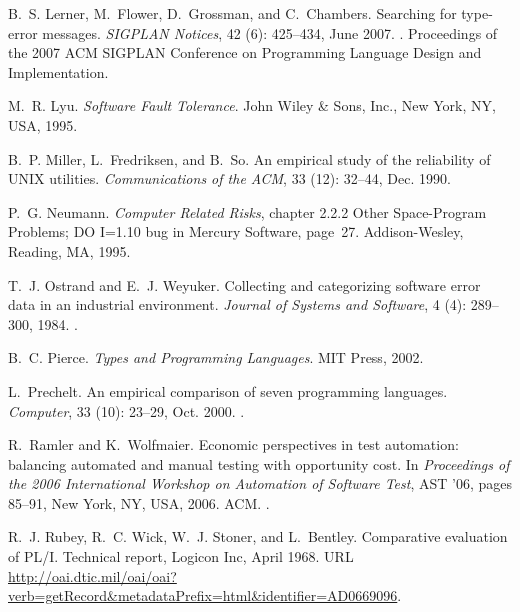 \documentclass[10pt]{sigplanconf}
\begin{document}
\begin{thebibliography}{35}
B.~S. Lerner, M.~Flower, D.~Grossman, and C.~Chambers.
\newblock Searching for type-error messages.
\newblock \emph{SIGPLAN Notices}, 42 (6): 425--434, June
  2007.
\newblock {}.
\newblock Proceedings of the 2007 ACM SIGPLAN Conference on Programming
  Language Design and Implementation.

M.~R. Lyu.
\newblock \emph{Software Fault Tolerance}.
\newblock John Wiley \& Sons, Inc., New York, NY, USA, 1995.

B.~P. Miller, L.~Fredriksen, and B.~So.
\newblock An empirical study of the reliability of {UNIX} utilities.
\newblock \emph{Communications of the ACM}, 33 (12): 32--44,
  Dec. 1990.

P.~G. Neumann.
\newblock \emph{Computer Related Risks}, chapter 2.2.2 Other Space-Program
  Problems; {DO} I=1.10 bug in {M}ercury Software, page~27.
\newblock Addison-Wesley, Reading, MA, 1995.

T.~J. Ostrand and E.~J. Weyuker.
\newblock Collecting and categorizing software error data in an industrial
  environment.
\newblock \emph{Journal of Systems and Software}, 4 (4):
  289--300, 1984.
\newblock {}.

B.~C. Pierce.
\newblock \emph{Types and Programming Languages}.
\newblock MIT Press, 2002.

L.~Prechelt.
\newblock An empirical comparison of seven programming languages.
\newblock \emph{Computer}, 33 (10): 23--29, Oct. 2000.
\newblock {}.

R.~Ramler and K.~Wolfmaier.
\newblock Economic perspectives in test automation: balancing automated and
  manual testing with opportunity cost.
\newblock In \emph{Proceedings of the 2006 International Workshop on Automation
  of Software Test}, AST '06, pages 85--91, New York, NY, USA, 2006. ACM.
\newblock {}.

R.~J. Rubey, R.~C. Wick, W.~J. Stoner, and L.~Bentley.
\newblock Comparative evaluation of {PL/I}.
\newblock Technical report, Logicon Inc, April 1968.
\newblock URL
  \url{http://oai.dtic.mil/oai/oai?verb=getRecord&metadataPrefix=html&identifier=AD0669096}.


\end{thebibliography}
\end{document}
